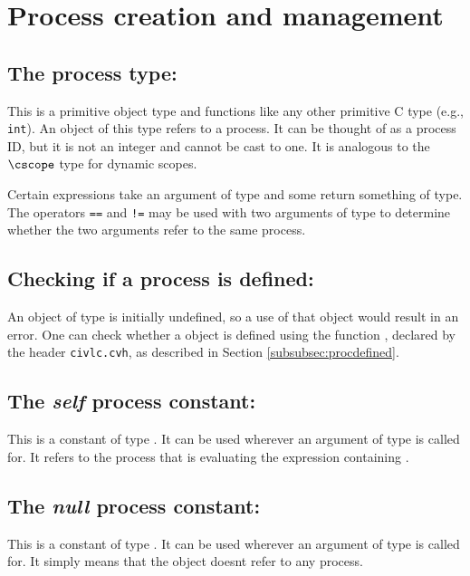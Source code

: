 \section{Process creation and management}

\subsection{The process type: \cproc}

This is a primitive object type and functions like any other primitive
C type (e.g., \texttt{int}). An object of this type refers to a
process. It can be thought of as a process ID, but it is not an
integer and cannot be cast to one.  It is analogous to the $\cscope$
type for dynamic scopes.

Certain expressions take an argument of \cproc{} type and some return
something of \cproc{} type.  The operators \verb!==! and \verb~!=~ may
be used with two arguments of type \cproc{} to determine whether the
two arguments refer to the same process.

\subsection{Checking if a process is defined: \cprocdefined}

An object of type \cproc{} is initially undefined, so a use of that
object would result in an error.  One can check whether a \cproc{}
object is defined using the function \cprocdefined, declared by the header \texttt{civlc.cvh}, as 
described in Section \ref{subsubsec:procdefined}.

\subsection{The \emph{self} process constant: \cself}

This is a constant of type \cproc. It can be used wherever an argument
of type \cproc{} is called for. It refers to the process that is
evaluating the expression containing \cself.

\subsection{The \emph{null} process constant: \cprocNull}

This is a constant of type \cproc. It can be used wherever an argument
of type \cproc{} is called for. It simply means that the object doesnt refer to any process.

